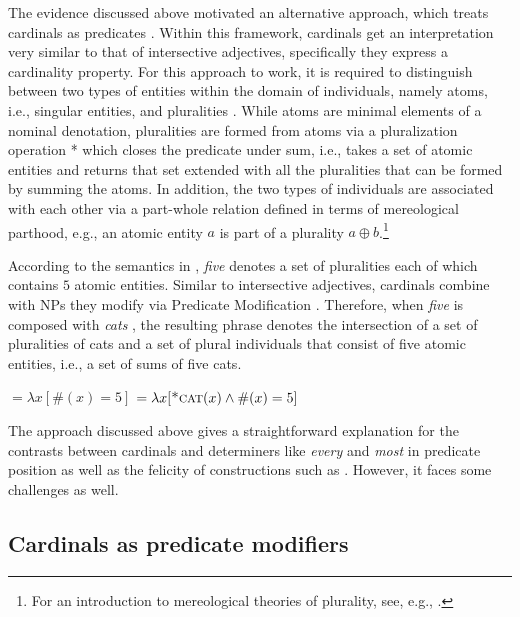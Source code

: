 \documentclass[output=paper]{langscibook}
\begin{document}
\noindent The evidence discussed above motivated an alternative approach, which treats cardinals as predicates \citep{landman2003predicate,landman2004indefinites}. Within this framework, cardinals get an interpretation very similar to that of intersective adjectives, specifically they express a cardinality property. For this approach to work, it is required to distinguish between two types of entities within the domain of individuals, namely atoms, i.e., singular entities, and pluralities \citep{link83}. While atoms are minimal elements of a nominal denotation, pluralities are formed from atoms via a pluralization operation * which closes the predicate under sum, i.e., takes a set of atomic entities and returns that set extended with all the pluralities that can be formed by summing the atoms. In addition, the two types of individuals are associated with each other via a part-whole relation defined in terms of mereological parthood, e.g., an atomic entity $a$ is part of a plurality $a \oplus b$.\footnote{For an introduction to mereological theories of plurality, see, e.g., \citet{champollion_krifka2016mereology}.} 

According to the semantics in , \textit{five} denotes a set of pluralities each of which contains $5$ atomic entities. Similar to intersective adjectives, cardinals combine with NPs they modify via Predicate Modification  \citep{heim_kratzer1998semantics}. Therefore, when \textit{five} is composed with \textit{cats} , the resulting phrase denotes the intersection of a set of pluralities of cats and a set of plural individuals that consist of five atomic entities, i.e., a set of sums of five cats. 

	\ea \ea {} $=\lambda x[\#(x)=5]$\label{ex:five-predicate}
	\ex {} $=\lambda x[\textsc{*cat}(x) \wedge \#(x)=5]$\label{ex:five-cats-predicate}
	\z
	\z

\noindent The approach discussed above gives a straightforward explanation for the contrasts between cardinals and determiners like \textit{every} and \textit{most} in predicate position as well as the felicity of constructions such as . However, it faces some challenges as well.

\subsection{Cardinals as predicate modifiers}\label{sec:cardinals-as-predicate-modifiers}
\end{document}
